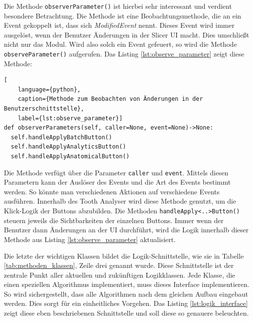Die Methode \texttt{observerParameter()} ist hierbei sehr interessant und verdient
besondere Betrachtung. Die Methode ist eine Beobachtungsmethode, die an ein Event
gekoppelt ist, dass sich \textit{ModifiedEvent} nennt. Dieses Event wird immer
ausgelöst, wenn der Benutzer Änderungen in der Slicer \ac{UI} macht. Dies umschließt
nicht nur das Modul. Wird also solch ein Event gefeuert, so wird die Methode \texttt{observeParameter()}
aufgerufen. Das Listing \ref{lst:observe_parameter} zeigt diese Methode:

\begin{lstlisting}[
    language={python},
    caption={Methode zum Beobachten von Änderungen in der Benutzerschnittstelle},
    label={lst:observe_parameter}]
def observerParameters(self, caller=None, event=None)->None:
  self.handleApplyBatchButton()
  self.handleApplyAnalyticsButton()
  self.handleApplyAnatomicalButton()
\end{lstlisting}

Die Methode verfügt über die Parameter \texttt{caller} und \texttt{event}. Mittels
diesen Parametern kann der Auslöser des Events und die Art des Events bestimmt werden.
So könnte man verschiedenen Aktionen auf verschiedene Events ausführen. Innerhalb
des Tooth Analyser wird diese Methode genutzt, um die Klick-Logik der Buttons
abzubilden. Die Methoden \texttt{handleApply<..>Button()} steuern jeweils die
Sichtbarkeiten der einzelnen Buttons. Immer wenn der Benutzer dann Änderungen an
der \ac{UI} durchführt, wird die Logik innerhalb dieser Methode aus Listing \ref{lst:observe_parameter}
aktualisiert.

Die letzte der wichtigen Klassen bildet die Logik-Schnittstelle, wie sie in
Tabelle \ref{tab:methoden_klassen}, Zeile drei genannt wurde. Diese
Schnittstelle ist der zentrale Punkt aller aktuellen und zukünftigen
Logikklassen. Jede Klasse, die einen speziellen Algorithmus implementiert, muss dieses
Interface implementieren. So wird sichergestellt, dass alle Algorithmen nach dem
gleichen Aufbau eingebaut werden. Dies sorgt für ein einheitliches Vorgehen. Das
Listing \ref{lst:logik_interface} zeigt diese eben beschriebenen Schnittstelle und
soll diese so genauere beleuchten.

\pagebreak

